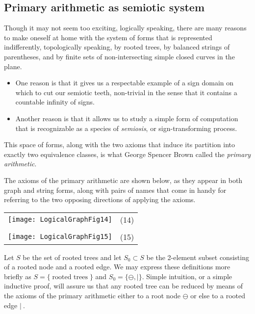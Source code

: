 \documentclass[12pt]{article}
\begin{document}
\subsection{Primary arithmetic as semiotic system}

Though it may not seem too exciting, logically speaking, there are many reasons to make oneself at home with the system of forms that is represented indifferently, topologically speaking, by rooted trees, by balanced strings of parentheses, and by finite sets of non-intersecting simple closed curves in the plane.

\begin{itemize}
\item
One reason is that it gives us a respectable example of a sign domain on which to cut our semiotic teeth, non-trivial in the sense that it contains a countable infinity of signs.
\item
Another reason is that it allows us to study a simple form of computation that is recognizable as a species of \textit{semiosis}, or sign-transforming process.
\end{itemize}

This space of forms, along with the two axioms that induce its partition into exactly two equivalence classes, is what George Spencer Brown called the \textit{primary arithmetic}.

The axioms of the primary arithmetic are shown below, as they appear in both graph and string forms, along with pairs of names that come in handy for referring to the two opposing directions of applying the axioms.

\begin{center}\begin{tabular}{cc}
\texttt{[image: LogicalGraphFig14]} & (14) \\
\\
\texttt{[image: LogicalGraphFig15]} & (15) \\
\end{tabular}\end{center}

Let $S$ be the set of rooted trees and let $S_0 \subset S$ be the 2-element subset consisting of a rooted node and a rooted edge.  We may express these definitions more briefly as $S = \{ \operatorname{rooted~trees} \}$ and $S_0 = \{ \ominus, \vert \}.$  Simple intuition, or a simple inductive proof, will assure us that any rooted tree can be reduced by means of the axioms of the primary arithmetic either to a root node $\ominus$ or else to a rooted edge $\vert\ .$
\end{document}
